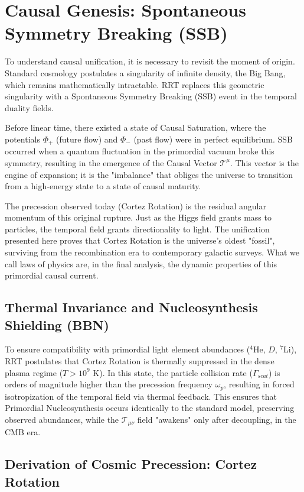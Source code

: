 \documentclass[12pt, a4paper]{article}
\begin{document}
\section{Causal Genesis: Spontaneous Symmetry Breaking (SSB)}

To understand causal unification, it is necessary to revisit the moment of origin. Standard cosmology postulates a singularity of infinite density, the Big Bang, which remains mathematically intractable. RRT replaces this geometric singularity with a Spontaneous Symmetry Breaking (SSB) event in the temporal duality fields.

Before linear time, there existed a state of Causal Saturation, where the potentials $\Phi_{+}$ (future flow) and $\Phi_{-}$ (past flow) were in perfect equilibrium. SSB occurred when a quantum fluctuation in the primordial vacuum broke this symmetry, resulting in the emergence of the Causal Vector $\mathcal{T}^\mu$. This vector is the engine of expansion; it is the "imbalance" that obliges the universe to transition from a high-energy state to a state of causal maturity.

The precession observed today (Cortez Rotation) is the residual angular momentum of this original rupture. Just as the Higgs field grants mass to particles, the temporal field grants directionality to light. The unification presented here proves that Cortez Rotation is the universe's oldest "fossil", surviving from the recombination era to contemporary galactic surveys. What we call laws of physics are, in the final analysis, the dynamic properties of this primordial causal current.

\subsection{Thermal Invariance and Nucleosynthesis Shielding (BBN)}
To ensure compatibility with primordial light element abundances ($^4$He, $D$, $^7$Li), RRT postulates that Cortez Rotation is thermally suppressed in the dense plasma regime ($T > 10^9$ K). In this state, the particle collision rate ($\Gamma_{scat}$) is orders of magnitude higher than the precession frequency $\omega_p$, resulting in forced isotropization of the temporal field via thermal feedback. This ensures that Primordial Nucleosynthesis occurs identically to the standard model, preserving observed abundances, while the $\mathcal{T}_{\mu\nu}$ field "awakens" only after decoupling, in the CMB era.

\subsection{Derivation of Cosmic Precession: Cortez Rotation}
\end{document}
